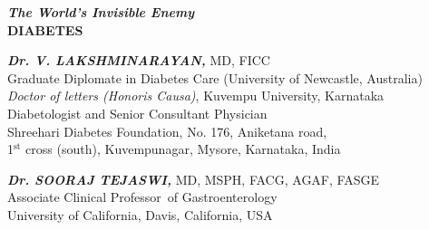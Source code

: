 \thispagestyle{empty}

\begin{center}
\Huge\textbf{\textit{The World’s Invisible Enemy}\\ DIABETES}
\end{center}

\vskip 150pt


\begin{center}
{\large\textbf{\textit{Dr. V. LAKSHMINARAYAN,}} MD, FICC\\{\small Graduate Diplomate in Diabetes Care (University of Newcastle, Australia)\\\textit{Doctor of letters (Honoris Causa)}, Kuvempu University, Karnataka\\ Diabetologist and Senior Consultant Physician\\ Shreehari Diabetes Foundation, No. 176, Aniketana road,\\ 1$^{\text{st}}$ cross (south), Kuvempunagar, Mysore, Karnataka, India}}
\end{center}

\vskip 30pt

\begin{center}
{\large\textbf{\textit{Dr. SOORAJ TEJASWI,}} MD, MSPH, FACG, AGAF, FASGE\\{\small Associate Clinical Professor of Gastroenterology\\ University of California, Davis, California, USA}}
\end{center}
